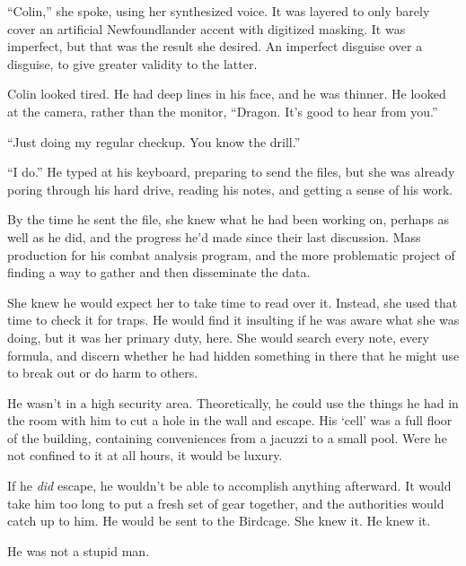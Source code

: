 ``Colin,'' she spoke, using her synthesized voice.  It was layered to only barely cover an artificial Newfoundlander accent with digitized masking.  It was imperfect, but that was the result she desired.  An imperfect disguise over a disguise, to give greater validity to the latter.



Colin looked tired.  He had deep lines in his face, and he was thinner.  He looked at the camera, rather than the monitor, ``Dragon.  It's good to hear from you.''



``Just doing my regular checkup.  You know the drill.''



``I do.''  He typed at his keyboard, preparing to send the files, but she was already poring through his hard drive, reading his notes, and getting a sense of his work.



By the time he sent the file, she knew what he had been working on, perhaps as well as he did, and the progress he'd made since their last discussion.  Mass production for his combat analysis program, and the more problematic project of finding a way to gather and then disseminate the data.



She knew he would expect her to take time to read over it.  Instead, she used that time to check it for traps.  He would find it insulting if he was aware what she was doing, but it was her primary duty, here.  She would search every note, every formula, and discern whether he had hidden something in there that he might use to break out or do harm to others.



He wasn't in a high security area.  Theoretically, he could use the things he had in the room with him to cut a hole in the wall and escape.  His `cell' was a full floor of the building, containing conveniences from a jacuzzi to a small pool.  Were he not confined to it at all hours, it would be luxury.



If he \emph{did} escape, he wouldn't be able to accomplish anything afterward.  It would take him too long to put a fresh set of gear together, and the authorities would catch up to him.  He would be sent to the Birdcage.  She knew it.  He knew it.



He was not a stupid man.



